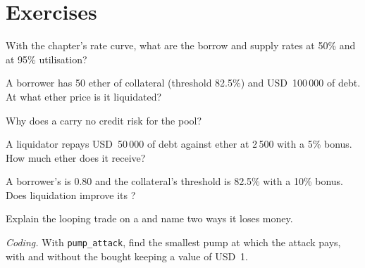 \section{Exercises}

\begin{exercise}[$\star$]\label{exo:m3:defi-credit-and-leverage:1}
With the chapter's rate curve, what are the borrow and supply rates at 50\% and at 95\% utilisation?
\end{exercise}

\begin{exercise}[$\star$]\label{exo:m3:defi-credit-and-leverage:2}
A borrower has 50 ether of collateral (threshold 82.5\%) and USD~100\,000 of debt. At what ether price is it liquidated?
\end{exercise}

\begin{exercise}[$\star$]\label{exo:m3:defi-credit-and-leverage:3}
Why does a  carry no credit risk for the pool?
\end{exercise}

\begin{exercise}[$\star\star$]\label{exo:m3:defi-credit-and-leverage:4}
A liquidator repays USD~50\,000 of debt against ether at 2\,500 with a 5\% bonus. How much ether does it receive?
\end{exercise}

\begin{exercise}[$\star\star$]\label{exo:m3:defi-credit-and-leverage:5}
A borrower's  is 0.80 and the collateral's threshold is 82.5\% with a 10\% bonus. Does liquidation improve its ?
\end{exercise}

\begin{exercise}[$\star\star$]\label{exo:m3:defi-credit-and-leverage:6}
Explain the looping trade on a  and name two ways it loses money.
\end{exercise}

\begin{exercise}[$\star\star\star$]\label{exo:m3:defi-credit-and-leverage:7}
\emph{Coding.} With \texttt{pump\_attack}, find the smallest pump at which the attack pays, with and without the  bought keeping a value of USD~1.
\end{exercise}

